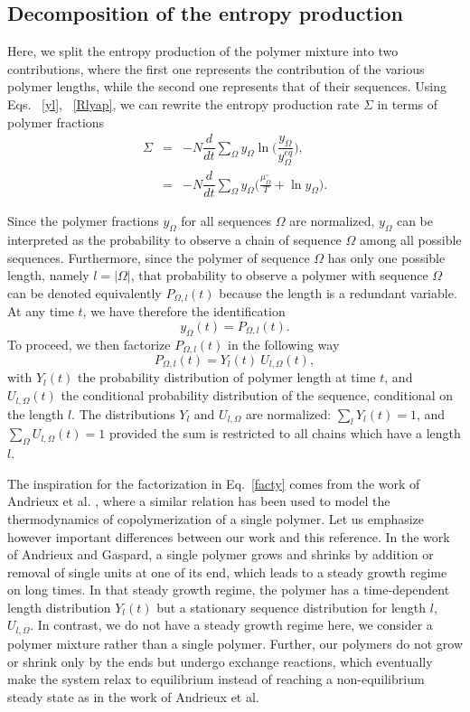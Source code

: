 \documentclass[
	amsmath,
	amssymb,
	a4paper,
	aip,		%
	jcp,		%
	reprint, twocolumn  %
	fleqn,
	showpacs,
	floatfix
]{revtex4-1}
\newcommand{\be}{\begin{equation}}
\newcommand{\ee}{\end{equation}}
\newcommand{\bea}{\begin{eqnarray}}
\newcommand{\eea}{\end{eqnarray}}
\begin{document}
\subsection{Decomposition of the entropy production}

Here, we split the entropy production of the polymer mixture into two contributions, where the 
first one represents the contribution of the various polymer lengths, while the second one represents that of their sequences. 
Using Eqs. ~\eqref{yl}, ~\eqref{Rlyap}, we can rewrite the entropy production rate $\Sigma$ in 
terms of polymer fractions
\bea
\Sigma &=& - N \dfrac{d}{dt} \sum_{\Omega} y_{\Omega} \ln \bigg( \dfrac{y_{\Omega} }{y^{eq} _{\Omega} } \bigg), \label{dGdt2} \\ \nonumber
&=& - N \dfrac{d}{dt} \sum_{\Omega} y_{\Omega} \bigg( \frac{ \mu^{\circ}_{\Omega}}{T} +   \ln  y_{\Omega}   \bigg).
\eea 

Since the polymer fractions $y_\Omega$ for all sequences $\Omega$ are normalized, $y_\Omega$ can be interpreted as the 
probability to observe a chain of sequence $\Omega$ among all possible sequences.
Furthermore, since the polymer of sequence $\Omega$ has only one possible length, namely $l=|\Omega|$, 
that probability to observe a polymer with sequence $\Omega$ can 
be denoted equivalently $P_{\Omega,l}(t)$ because the length is a redundant variable. 
At any time $t$, we have therefore the identification
\be
\label{defy}
y_\Omega(t)= P_{\Omega,l}(t).
\ee 
To proceed, we then factorize $P_{\Omega,l}(t)$ in the following way
\begin{equation}
P_{\Omega,l}(t)= Y_{l}(t) \ U_{l,\Omega}(t),
\label{facty}
\end{equation}
with $Y_{l}(t)$ the probability distribution of polymer length at time $t$, and $U_{l,\Omega}(t)$ the conditional probability distribution 
of the sequence, conditional on the length $l$.  
The distributions $Y_l$ and $U_{l,\Omega}$ are normalized: $\sum_{l} Y_{l}(t)=1$, and $\sum_{\Omega} U_{l,\Omega}(t)=1$ 
provided the sum is restricted to all chains which have a length $l$. 

The inspiration for the factorization in Eq.~\eqref{facty} comes from the work of Andrieux et al. \citep{Andrieux2008_vol105}, 
where a similar relation has been used to model the thermodynamics of copolymerization of a single polymer. 
Let us emphasize however important differences between our work and this reference.
In the work of Andrieux and Gaspard, a single polymer grows and shrinks by addition or removal of single units at one of its end, 
which leads to a steady growth regime on long times. In that steady growth regime, the polymer has a time-dependent length distribution $Y_{l}(t)$ 
but a stationary sequence distribution for length $l$, $U_{l,\Omega}$. 
In contrast, we do not have a steady growth regime here, 
we consider a polymer mixture rather than a single polymer. Further, 
our polymers do not grow or shrink only by the ends but undergo exchange reactions, which eventually 
make the system relax to equilibrium instead of reaching a non-equilibrium steady state as in the work of Andrieux et al. 
\end{document}

